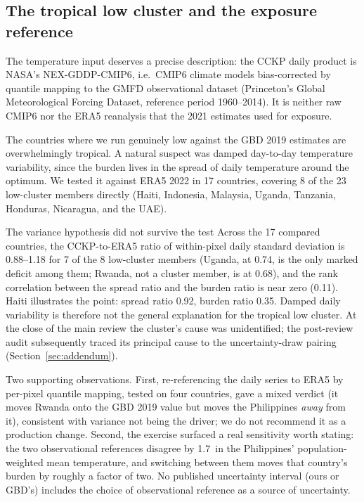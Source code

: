 \documentclass[11pt]{ozreport}
\begin{document}
\subsection{The tropical low cluster and the exposure reference}

The temperature input deserves a precise description: the CCKP daily
product is NASA's NEX-GDDP-CMIP6, i.e.\ CMIP6 climate models bias-corrected
by quantile mapping to the GMFD observational dataset (Princeton's Global
Meteorological Forcing Dataset, reference period 1960--2014). It is neither
raw CMIP6 nor the ERA5 reanalysis that the 2021 estimates used for
exposure.

The countries where we run genuinely low against the GBD 2019 estimates
are overwhelmingly tropical. A natural suspect was damped day-to-day
temperature variability, since the burden lives in the spread of daily
temperature around the optimum. We tested it against ERA5 2022 in 17
countries, covering 8 of the 23 low-cluster members directly (Haiti,
Indonesia, Malaysia, Uganda, Tanzania, Honduras, Nicaragua, and the UAE).

\begin{ozcaveat}{The variance hypothesis did not survive the test}
Across the 17 compared countries, the CCKP-to-ERA5 ratio of within-pixel
daily standard deviation is 0.88--1.18 for 7 of the 8 low-cluster members
(Uganda, at 0.74, is the only marked deficit among them; Rwanda, not a
cluster member, is at 0.68), and the rank correlation between the spread
ratio and the burden ratio is near zero (0.11). Haiti
illustrates the point: spread ratio 0.92, burden ratio 0.35. Damped daily
variability is therefore not the general explanation for the tropical low
cluster. At the close of the main review the cluster's cause was
unidentified; the post-review audit subsequently traced its principal
cause to the uncertainty-draw pairing (Section~\ref{sec:addendum}).
\end{ozcaveat}

Two supporting observations. First, re-referencing the daily series to
ERA5 by per-pixel quantile mapping, tested on four countries, gave a mixed
verdict (it moves Rwanda onto the GBD 2019 value but moves the Philippines
\emph{away} from it), consistent with variance not being the driver; we do
not recommend it as a production change. Second, the exercise surfaced a
real sensitivity worth stating: the two observational references disagree
by 1.7\,\textcelsius{} in the Philippines' population-weighted mean
temperature, and switching between them moves that country's burden by
roughly a factor of two. No published uncertainty interval (ours or GBD's)
includes the choice of observational reference as a source of uncertainty.
\end{document}
